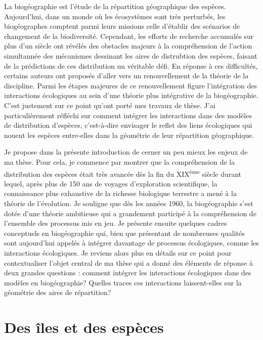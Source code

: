 La biogéographie est l'étude de la répartition géographique des espèces.
Aujourd'hui, dans un monde où les écosystèmes sont très perturbés, les
biogéographes comptent parmi leurs missions celle d'établir des
scénarios de changement de la biodiversité. Cependant, les efforts de
recherche accumulés sur plus d'un siècle ont révélés des obstacles
majeurs à la compréhension de l'action simultannée des mécanismes
dessinant les aires de distrubtion des espèces, faisant de la
prédictions de ces distribution un véritable défi. En réponse à ces
difficultés, certains auteurs ont proposés d'aller vers un
renouvellement de la théorie de la discipline. Parmi les étapes majeures
de ce renouvellement figure l'intégration des interactions écologiques
au sein d'une théorie plus intégrative de la biogéographie. C'est
justement sur ce point qu'ont porté mes travaux de thèse. J'ai
particulièrement réfléchi sur comment intégrer les interactions dans des
modèles de distribution d'espèces, c'est-à-dire envisager le reflet des
liens écologiques qui nouent les espèces entre-elles dans la géométrie
de leur répartition géographique.

Je propose dans la présente introduction de cerner un peu mieux les
enjeux de ma thèse. Pour cela, je commence par montrer que la
compréhension de la distribution des espèces était très avancée dès la
fin du XIX\textsuperscript{ème} siècle durant lequel, après plus de 150
ans de voyages d'exploration scientifique, la connaissance plus
exhaustive de la richesse biologique terrestre a mené à la théorie de
l'évolution. Je souligne que dès les années 1960, la biogéographie s'est
dotée d'une théorie ambitieuse qui a grandement participé à la
compréhension de l'ensemble des processus mis en jeu. Je présente
ensuite quelques cadres conceptuels en biogéographie qui, bien que
présentant de nombreuses qualités sont aujourd'hui appelés à intégrer
davantage de processus écologiques, comme les interactions écologiques.
Je reviens alors plus en détails sur ce point pour contextualiser
l'objet central de ma thèse qui a donné des éléments de réponse à deux
grandes questions : comment intégrer les interactions écologiques dans
des modèles en biogéographie? Quelles traces ces interactions
laissent-elles sur la géométrie des aires de répartition?

\section*{Des îles et des espèces}\label{des-uxeeles-et-des-espuxe8ces}

